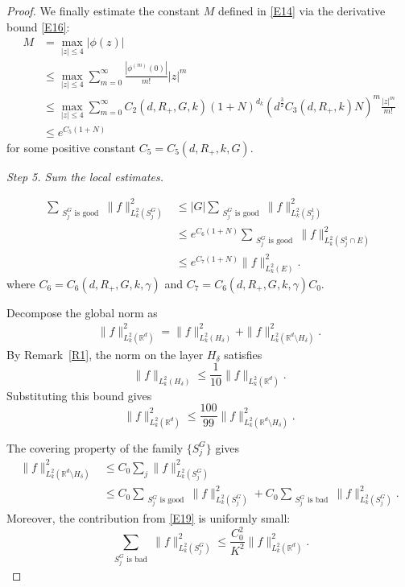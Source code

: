 \documentclass[12pt]{article}
\begin{document}
\begin{proof}
We finally estimate the constant $M$ defined in \eqref{E14} via the derivative bound \eqref{E16}:
\begin{equation}\label{E17}
\begin{split}
M &= \max_{|z|\le 4} |\phi(z)| \\
&\le \max_{|z|\le 4} \sum_{m=0}^{\infty} \frac{|\phi^{(m)}(0)|}{m!} |z|^m \\
&\le \max_{|z|\le 4} \sum_{m=0}^{\infty} C_2(d, R_+, G, k) (1 + N)^{d_k} \left(d^{\frac{3}{2}} C_3(d, R_+, k) N\right)^m \frac{|z|^m}{m!} \\
&\leq e^{C_5(1+N)}
\end{split}
\end{equation}
for some positive constant $C_5 = C_5(d, R_+, k, G)$.


\emph{Step 5. Sum the local estimates.}

\begin{equation}\label{E20}
\begin{aligned}
\sum_{\substack{S_j^G \text{ is good}}} \|f\|^2_{L_k^2(S_j^G)}
&\leq |G| \sum_{\substack{S_j^G \text{ is good}}} \|f\|^2_{L_k^2(S_j^1)} \\
&\leq e^{C_6(1+N)} \sum_{\substack{S_j^G \text{ is good}}} \|f\|^2_{L_k^2(S_j^1 \cap E)} \\
&\leq e^{C_7(1+N)} \|f\|^2_{L_k^2(E)}.
\end{aligned}
\end{equation}
where $C_6 = C_6(d, R_+, G, k, \gamma)$ and $C_7 = C_6(d, R_+, G, k, \gamma) C_0$.

Decompose the global norm as
\begin{align*}
\|f\|^2_{L_k^2(\mathbb{R}^d)}
=\|f\|^2_{L_k^2(H_\delta)} + \|f\|^2_{L_k^2(\mathbb{R}^d\setminus H_\delta)}.
\end{align*}
By Remark~\ref{R1}, the norm on the layer $H_\delta$ satisfies
\[
\|f\|_{L_k^2(H_\delta)} \le \frac{1}{10} \|f\|_{L_k^2(\mathbb{R}^d)}.
\]
Substituting this bound gives
\[
\|f\|^2_{L_k^2(\mathbb{R}^d)}
\le \frac{100}{99} \|f\|^2_{L_k^2(\mathbb{R}^d\setminus H_\delta)}.
\]

The covering property of the family $\{S_j^G\}$ gives
\begin{align*}
\|f\|^2_{L_k^2(\mathbb{R}^d\setminus H_\delta)}
&\le C_0 \sum_{j} \|f\|^2_{L_k^2(S_j^G)} \\
&\le C_0 \sum_{\substack{S_j^G \text{ is good}}} \|f\|^2_{L_k^2(S_j^G)}
+ C_0 \sum_{\substack{S_j^G \text{ is bad}}} \|f\|^2_{L_k^2(S_j^G)}.
\end{align*}
Moreover, the contribution from \eqref{E19} is uniformly small:
\[
\sum_{\substack{S_j^G \text{ is bad}}} \|f\|^2_{L_k^2(S_j^G)}
\le \frac{C_0^2}{K^2} \|f\|^2_{L_k^2(\mathbb{R}^d)}.
\]


\end{proof}
\end{document}
